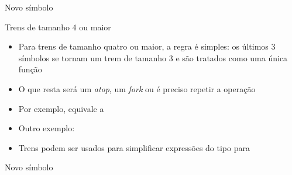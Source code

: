 \begin{frame}[fragile]{Novo símbolo}
\end{frame}

\begin{frame}[fragile]{Trens de tamanho 4 ou maior}

    \begin{itemize}
        \item Para trens de tamanho quatro ou maior, a regra é simples: os últimos 3 símbolos se tornam um trem de tamanho 3 e são tratados como uma única função
        \pause

        \item O que resta será um \textit{atop}, um \textit{fork} ou é preciso repetir a operação
        \pause

        \item Por exemplo,   equivale a 
        \pause
        
        \item Outro exemplo:
        \pause

        \item Trens podem ser usados para simplificar expressões do tipo  para 
    \end{itemize}

\end{frame}

\begin{frame}[fragile]{Novo símbolo}


\end{frame}
